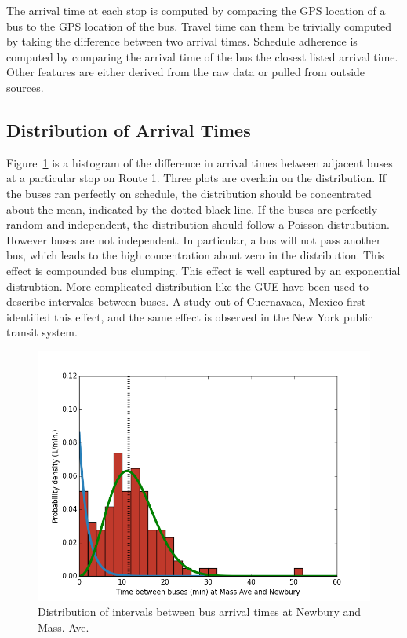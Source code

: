 The arrival time at each stop is computed by comparing the GPS location of a bus to the GPS location of the bus.
Travel time can them be trivially computed by taking the difference between two arrival times.
Schedule adherence is computed by comparing the arrival time of the bus the closest listed arrival time.
Other features are either derived from the raw data or pulled from outside sources.

\subsection{Distribution of Arrival Times}

Figure~\ref{dist} is a histogram of the difference in arrival times between adjacent buses at a particular stop on Route 1.
Three plots are overlain on the distribution.
If the buses ran perfectly on schedule, the distribution should be concentrated about the mean, indicated by the dotted black line.
If the buses are perfectly random and independent, the distribution should follow a Poisson distrubution.
However buses are not independent.
In particular, a bus will not pass another bus, which leads to the high concentration about zero in the distribution.
This effect is compounded bus clumping.
This effect is well captured by an exponential distrubtion.
More complicated distribution like the GUE have been used to describe intervales between buses.
A study out of Cuernavaca, Mexico \cite{baik2006model} first identified this effect, and the same effect is observed in the New York public transit system.

\begin{figure}
\includegraphics[width=\linewidth]{images/dist.png}
\caption{Distribution of intervals between bus arrival times at Newbury and Mass. Ave.}
\label{dist}
\end{figure}

